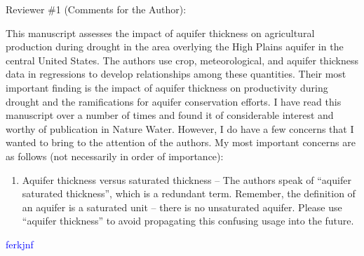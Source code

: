 \documentclass[
]{article}
\author{}
\date{\vspace{-2.5em}}
\providecommand{\tightlist}{%
  \setlength{\itemsep}{0pt}\setlength{\parskip}{0pt}}
\begin{document}
Reviewer \#1 (Comments for the Author):

This manuscript assesses the impact of aquifer thickness on agricultural
production during drought in the area overlying the High Plains aquifer
in the central United States. The authors use crop, meteorological, and
aquifer thickness data in regressions to develop relationships among
these quantities. Their most important finding is the impact of aquifer
thickness on productivity during drought and the ramifications for
aquifer conservation efforts. I have read this manuscript over a number
of times and found it of considerable interest and worthy of publication
in Nature Water. However, I do have a few concerns that I wanted to
bring to the attention of the authors. My most important concerns are as
follows (not necessarily in order of importance):

\begin{enumerate}
\def\labelenumi{\arabic{enumi}.}
\tightlist
\item
  Aquifer thickness versus saturated thickness -- The authors speak of
  ``aquifer saturated thickness'', which is a redundant term. Remember,
  the definition of an aquifer is a saturated unit -- there is no
  unsaturated aquifer. Please use ``aquifer thickness'' to avoid
  propagating this confusing usage into the future.
\end{enumerate}

\textcolor{blue}{ferkjnf}
\end{document}
